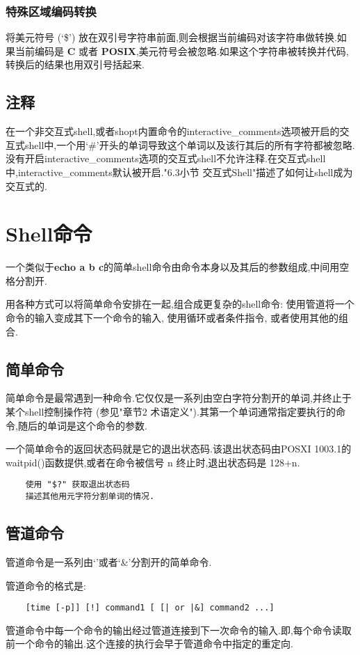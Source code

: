 \documentclass[draft,openany]{book}
\begin{document}
\begin{CJK}{UTF8}{gbsn}
    \subsubsection{特殊区域编码转换}
    将美元符号 (`\$') 放在双引号字符串前面,则会根据当前编码对该字符串做转换.如果当前编码是 \textbf{C} 或者 \textbf{POSIX},美元符号会被忽略.如果这个字符串被转换并代码,转换后的结果也用双引号括起来.

    \subsection{注释}
    在一个非交互式shell,或者shopt内置命令的interactive\_comments选项被开启的交互式shell中,一个用`\#'开头的单词导致这个单词以及该行其后的所有字符都被忽略.没有开启interactive\_comments选项的交互式shell不允许注释.在交互式shell中,interactive\_comments默认被开启."6.3小节 交互式Shell"描述了如何让shell成为交互式的.

    \section{Shell命令}
    一个类似于\textbf{echo a b c}的简单shell命令由命令本身以及其后的参数组成,中间用空格分割开.\par
    用各种方式可以将简单命令安排在一起,组合成更复杂的shell命令: 使用管道将一个命令的输入变成其下一个命令的输入, 使用循环或者条件指令, 或者使用其他的组合.
    \subsection{简单命令}
    简单命令是最常遇到一种命令.它仅仅是一系列由空白字符分割开的单词,并终止于某个shell控制操作符 (参见"章节2 术语定义").其第一个单词通常指定要执行的命令,随后的单词是这个命令的参数.\par
    一个简单命令的返回状态码就是它的退出状态码.该退出状态码由POSXI 1003.1的waitpid()函数提供,或者在命令被信号 n 终止时,退出状态码是 128+n.
    \begin{verbatim}
    使用 "$?" 获取退出状态码
    描述其他用元字符分割单词的情况.
    \end{verbatim}

    \subsection{管道命令}
    管道命令是一系列由`\textbar'或者`\textbar \&'分割开的简单命令.\par
    管道命令的格式是:
    \begin{verbatim}
    [time [-p]] [!] command1 [ [| or |&] command2 ...]
    \end{verbatim}
    管道命令中每一个命令的输出经过管道连接到下一次命令的输入.即,每个命令读取前一个命令的输出.这个连接的执行会早于管道命令中指定的重定向.


\end{CJK}
\end{document}
